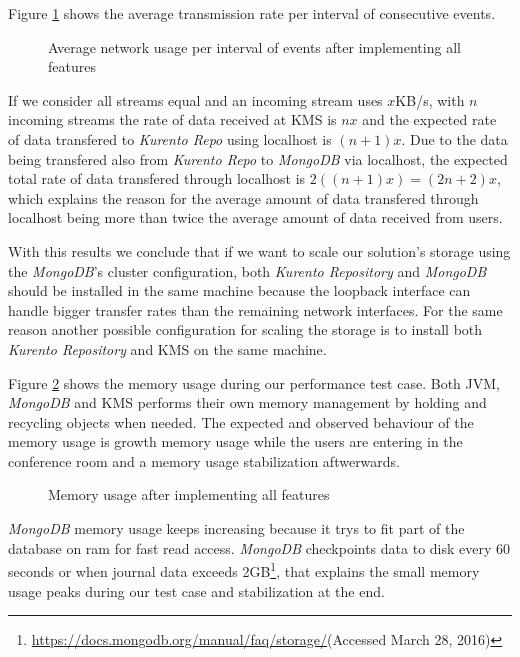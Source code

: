       Figure \ref{fig:summary_full_net} shows the average transmission rate per interval of consecutive events. 

\begin{figure}[!htb]
  \begin{center}
    
  \end{center}
  \caption{Average network usage per interval of events after implementing all features}
  \label{fig:summary_full_net}
\end{figure}

If we consider all streams equal and an incoming stream uses $x$KB/s, with $n$ incoming streams the rate of data received at \ac{KMS} is $nx$ and the expected rate of data transfered to \emph{Kurento Repo} using localhost is $(n+1)x$. Due to the data being transfered also from \emph{Kurento Repo} to \emph{MongoDB} via localhost, the expected total rate of data transfered through localhost is $2((n+1)x) = (2n+2)x$, which explains the reason for the average amount of data transfered through localhost being more than twice the average amount of data received from users.

With this results we conclude that if we want to scale our solution's storage using the \emph{MongoDB}'s cluster configuration, both \emph{Kurento Repository} and \emph{MongoDB} should be installed in the same machine because the loopback interface can handle bigger transfer rates than the remaining network interfaces. For the same reason another possible configuration for scaling the storage is to install both \emph{Kurento Repository} and \ac{KMS} on the same machine.

Figure \ref{fig:test_full_features_mem} shows the memory usage during our performance test case. Both \ac{JVM}, \emph{MongoDB} and \ac{KMS} performs their own memory management by holding and recycling objects when needed. The expected and observed behaviour of the memory usage is growth memory usage while the users are entering in the conference room and a memory usage stabilization aftwerwards.


\begin{figure}[!htb]
  \begin{center}
    
  \end{center}
  \caption{Memory usage after implementing all features}
  \label{fig:test_full_features_mem}
\end{figure}

\emph{MongoDB} memory usage keeps increasing because it trys to fit part of the database on ram for fast read access. \emph{MongoDB} checkpoints data to disk every 60 seconds or when journal data exceeds 2GB\footnote{\url{https://docs.mongodb.org/manual/faq/storage/}(Accessed March 28, 2016)}, that explains the small memory usage peaks during our test case and stabilization at the end.

